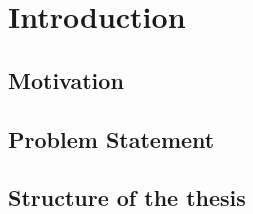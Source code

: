
\chapter*{Introduction}
\label{sec:orgef2e816}

\section*{Motivation}
\label{sec:org16c5fba}

\section*{Problem Statement}
\label{sec:org8a8175b}


\section*{Structure of the thesis}
\label{sec:orgc0b949b}
